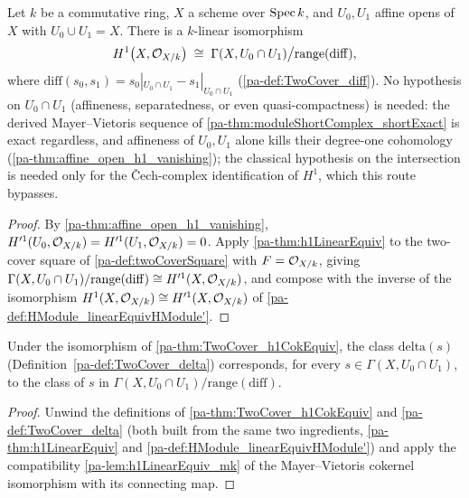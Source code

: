 \begin{theorem}
  \label{pa-thm:TwoCover_h1CokEquiv}
  \leanok

  Let \(k\) be a commutative ring, \(X\) a scheme over \(\operatorname{Spec} k\), and \(U_0, U_1\) affine
  opens of \(X\) with \(U_0 \cup U_1 = X\). There is a \(k\)-linear isomorphism
  \[
    H^1\bigl(X, \mathcal{O}_{X/k}\bigr) \;\cong\; \Gamma(X, U_0 \cap U_1)\big/\mathrm{range}(\mathrm{diff}),
  \]
  where \(\mathrm{diff}(s_0,s_1) = s_0|_{U_0 \cap U_1} - s_1|_{U_0 \cap U_1}\)
  (\ref{pa-def:TwoCover_diff}). No hypothesis on \(U_0 \cap U_1\) (affineness, separatedness, or
  even quasi-compactness) is needed: the derived Mayer--Vietoris sequence of
  \ref{pa-thm:moduleShortComplex_shortExact} is exact regardless, and affineness of \(U_0, U_1\)
  alone kills their degree-one cohomology (\ref{pa-thm:affine_open_h1_vanishing}); the classical
  hypothesis on the intersection is needed only for the \v{C}ech-complex identification of
  \(H^1\), which this route bypasses.
\end{theorem}
\begin{proof}
  \leanok
  By \ref{pa-thm:affine_open_h1_vanishing}, \(H'^1(U_0,\mathcal{O}_{X/k}) = H'^1(U_1,\mathcal{O}_{X/k}) = 0\).
  Apply \ref{pa-thm:h1LinearEquiv} to the two-cover square of \ref{pa-def:twoCoverSquare} with
  \(F = \mathcal{O}_{X/k}\), giving
  \(\Gamma(X, U_0 \cap U_1)/\mathrm{range}(\mathrm{diff}) \cong H'^1(X,\mathcal{O}_{X/k})\), and
  compose with the inverse of the isomorphism
  \(H^1(X,\mathcal{O}_{X/k}) \cong H'^1(X,\mathcal{O}_{X/k})\) of
  \ref{pa-def:HModule_linearEquivHModule'}.
\end{proof}

\begin{lemma}
  \label{pa-lem:TwoCover_h1CokEquiv_delta}
  \leanok

  Under the isomorphism of \ref{pa-thm:TwoCover_h1CokEquiv}, the class
  \(\mathrm{delta}(s)\) (Definition~\ref{pa-def:TwoCover_delta}) corresponds, for every
  \(s \in \Gamma(X, U_0 \cap U_1)\), to the class of \(s\) in
  \(\Gamma(X,U_0 \cap U_1)/\mathrm{range}(\mathrm{diff})\).
\end{lemma}
\begin{proof}
  \leanok
  Unwind the definitions of \ref{pa-thm:TwoCover_h1CokEquiv} and \ref{pa-def:TwoCover_delta} (both
  built from the same two ingredients, \ref{pa-thm:h1LinearEquiv} and
  \ref{pa-def:HModule_linearEquivHModule'}) and apply the compatibility \ref{pa-lem:h1LinearEquiv_mk}
  of the Mayer--Vietoris cokernel isomorphism with its connecting map.
\end{proof}

